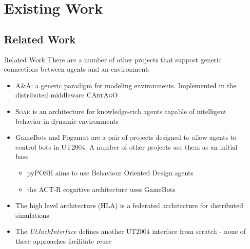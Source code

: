 \documentclass[t]{beamer}
\begin{document}
\section{Existing Work}
\subsection{Related Work}
\begin{frame}{Related Work}
	There are a number of other projects that support generic connections between agents and an environment:
	\begin{itemize}
		\item A\&A: a generic paradigm for modeling environments. Implemented in the distributed middleware \textsc{CArtAgO}
		\item \textsc{Soar} is an architecture for knowledge-rich agents capable of intelligent behavior in dynamic environments
		\item GameBots and Pogamut are a pair of projects designed to allow agents to control bots in UT2004. A number of other projects use them as an initial base
		\begin{itemize}
			\item pyPOSH aims to use Behaviour Oriented Design agents
			\item the ACT-R cognitive architecture uses GameBots
		\end{itemize}
		\item The high level architecture (HLA) is a federated architecture for distributed simulations
		\item The \textit{UtJackInterface} defines another UT2004 interface from scratch - none of these approaches facilitate reuse
	\end{itemize}
\end{frame}
\end{document}
